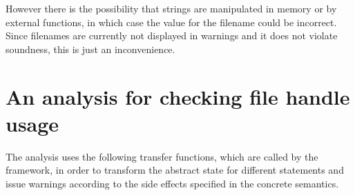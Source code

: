 However there is the possibility that strings are manipulated in memory or by external functions, in which case the value for the filename could be incorrect. Since filenames are currently not displayed in warnings and it does not violate soundness, this is just an inconvenience.



\section{An analysis for checking file handle usage}
The analysis uses the following transfer functions, which are called by the framework, in order to transform the abstract state for different statements and issue warnings according to the side effects specified in the concrete semantics.
